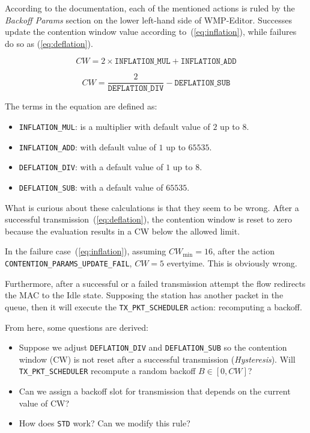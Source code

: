 According to the documentation, each of the mentioned actions is ruled by the \emph{Backoff Params} section on the lower left-hand side of WMP-Editor. Successes update the contention window value according to~(\ref{eq:inflation}), while failures do so as (\ref{eq:deflation}).

\begin{equation} \label{eq:inflation}
  CW = 2\times\texttt{INFLATION\_MUL}+\texttt{INFLATION\_ADD}
\end{equation}

\begin{equation} \label{eq:deflation}
  CW = \frac{2}{\texttt{DEFLATION\_DIV}}-\texttt{DEFLATION\_SUB}
\end{equation}

The terms in the equation are defined as:

\begin{itemize}
 \item \texttt{INFLATION\_MUL}: is a multiplier with default value of $2$ up to $8$.
 \item \texttt{INFLATION\_ADD}: with default value of $1$ up to $65535$.
 \item \texttt{DEFLATION\_DIV}: with a default value of $1$ up to $8$.
 \item \texttt{DEFLATION\_SUB}: with a default value of $65535$.
\end{itemize}

What is curious about these calculations is that they seem to be wrong. After a successful transmission~(\ref{eq:deflation}), the contention window is reset to zero because the evaluation results in a CW below the allowed limit. 

In the failure case~(\ref{eq:inflation}), assuming $CW_{\min}=16$, after the action \texttt{CONTENTION\_PARAMS\_UPDATE\_FAIL}, $CW=5$ evertyime. This is obviously wrong.

Furthermore, after a successful or a failed transmission attempt the flow redirects the MAC to the Idle state. Supposing the station has another packet in the queue, then it will execute the \texttt{TX\_PKT\_SCHEDULER} action: recomputing a backoff.

From here, some questions are derived:

\begin{itemize}
 \item Suppose we adjust \texttt{DEFLATION\_DIV} and \texttt{DEFLATION\_SUB} so the contention window (CW) is not reset after a successful transmission (\emph{Hysteresis}). Will \texttt{TX\_PKT\_SCHEDULER} recompute a random backoff $B\in[0,CW]$?
 \item Can we assign a backoff slot for transmission that depends on the current value of CW?
 \item How does \texttt{STD} work? Can we modify this rule?
\end{itemize}


